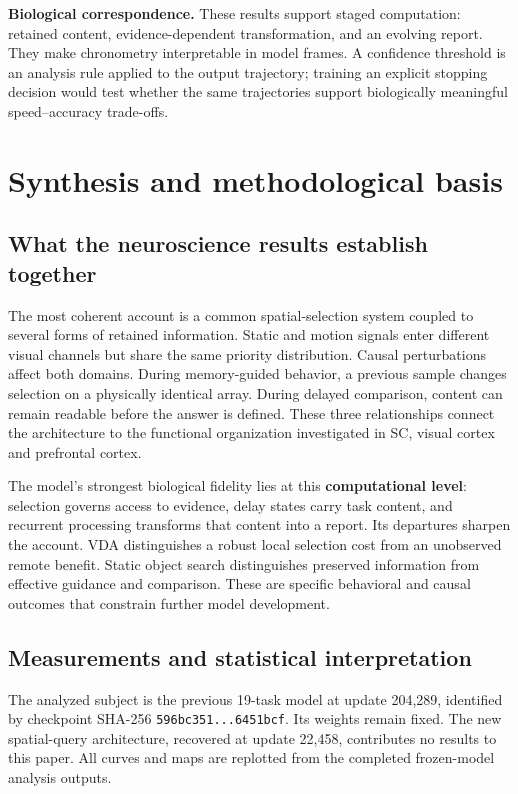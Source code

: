 \documentclass[11pt,letterpaper]{article}
\newcommand{\take}[1]{\par\textbf{Biological correspondence.} #1\par}
\begin{document}
\take{These results support staged computation: retained content, evidence-dependent transformation, and an evolving report. They make chronometry interpretable in model frames. A confidence threshold is an analysis rule applied to the output trajectory; training an explicit stopping decision would test whether the same trajectories support biologically meaningful speed--accuracy trade-offs.}

\clearpage
\section*{Synthesis and methodological basis}
\subsection*{What the neuroscience results establish together}
The most coherent account is a common spatial-selection system coupled to several forms of retained information. Static and motion signals enter different visual channels but share the same priority distribution. Causal perturbations affect both domains. During memory-guided behavior, a previous sample changes selection on a physically identical array. During delayed comparison, content can remain readable before the answer is defined. These three relationships connect the architecture to the functional organization investigated in SC, visual cortex and prefrontal cortex.

The model's strongest biological fidelity lies at this \textbf{computational level}: selection governs access to evidence, delay states carry task content, and recurrent processing transforms that content into a report. Its departures sharpen the account. VDA distinguishes a robust local selection cost from an unobserved remote benefit. Static object search distinguishes preserved information from effective guidance and comparison. These are specific behavioral and causal outcomes that constrain further model development.

\subsection*{Measurements and statistical interpretation}
The analyzed subject is the previous 19-task model at update 204,289, identified by checkpoint SHA-256 \texttt{596bc351...6451bcf}. Its weights remain fixed. The new spatial-query architecture, recovered at update 22,458, contributes no results to this paper. All curves and maps are replotted from the completed frozen-model analysis outputs.
\end{document}
